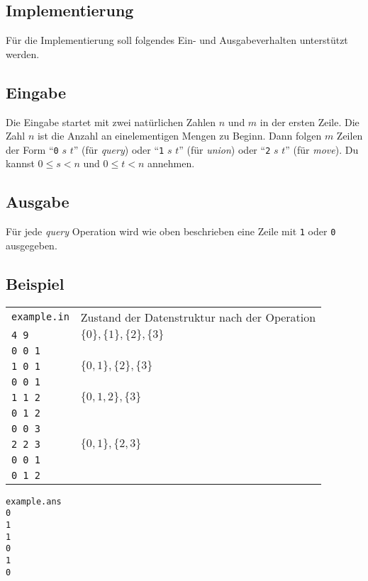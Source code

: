 \documentclass{uebung_cs}
\begin{document}
\begin{aufgabe}
  \appendix
  \section{Implementierung}\label{implementierung}
  Für die Implementierung soll folgendes Ein- und Ausgabeverhalten unterstützt werden.
  \subsection*{Eingabe}
  
  Die Eingabe startet mit zwei natürlichen Zahlen $n$ und $m$ in der ersten Zeile.
  Die Zahl $n$ ist die Anzahl an einelementigen Mengen zu Beginn.
  Dann folgen $m$ Zeilen der Form
  \enquote{\texttt{0} $s$ $t$} (für \emph{query}) oder \enquote{\texttt{1} $s$ $t$} (für \emph{union}) oder \enquote{\texttt{2} $s$ $t$} (für \emph{move}).
  Du kannst $0\leq s< n$ und $0\leq t< n$ annehmen.

  \subsection*{Ausgabe}
  
  Für jede \emph{query} Operation wird wie oben beschrieben eine Zeile mit \texttt{1} oder \texttt{0} ausgegeben.
  
  \subsection*{Beispiel}
  \begin{tabular}{ll}
  \texttt{example.in}& Zustand der Datenstruktur nach der Operation\\
    \texttt{4 9}   & $\{0\}, \{1\}, \{2\},\{3\}$\\
    \texttt{0 0 1} \\
    \texttt{1 0 1} & $\{0, 1\}, \{2\},\{3\}$ \\
    \texttt{0 0 1} &\\
    \texttt{1 1 2} & $\{0, 1, 2\},\{3\}$ \\
    \texttt{0 1 2} &\\
    \texttt{0 0 3} &\\
    \texttt{2 2 3}   & $\{0, 1\}, \{2,3\}$ \\
    \texttt{0 0 1} &\\
    \texttt{0 1 2} &
  \end{tabular}

  \noindent
  \begin{verbatim}
example.ans
0
1
1
0
1
0
  \end{verbatim}


\end{aufgabe}
\end{document}
